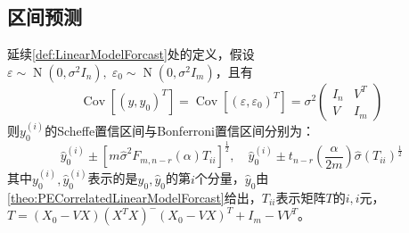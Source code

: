 \subsection{区间预测}
\begin{theorem}
	延续\ref{def:LinearModelForcast}处的定义，假设$\varepsilon\sim\operatorname{N}(0,\sigma^2I_n),\;\varepsilon_0\sim\operatorname{N}(0,\sigma^2I_m)$，且有
	\begin{equation*}
		\operatorname{Cov}[(y,y_0)^T]=\operatorname{Cov}[(\varepsilon,\varepsilon_0)^T]=\sigma^2
		\begin{pmatrix}
			I_n & V^T \\
			V & I_m 
		\end{pmatrix}
	\end{equation*}
	则$y_0^{(i)}$的Scheffe置信区间与Bonferroni置信区间分别为：
	\begin{equation*}
		\hat{y}_0^{(i)}\pm[m\hat{\sigma}^2F_{m,n-r}(\alpha)T_{ii}]^{\frac{1}{2}},\quad
		\hat{y}_0^{(i)}\pm t_{n-r}\left(\frac{\alpha}{2m}\right)\hat{\sigma}(T_{ii})^{\frac{1}{2}}
	\end{equation*}
	其中$y_0^{(i)},\hat{y}_0^{(i)}$表示的是$y_0,\hat{y}_0$的第$i$个分量，$\hat{y}_0$由\cref{theo:PECorrelatedLinearModelForcast}给出，$T_{ii}$表示矩阵$T$的$i,i$元，$T=(X_0-VX)(X^TX)^-(X_0-VX)^T+I_m-VV^T$。
\end{theorem}
